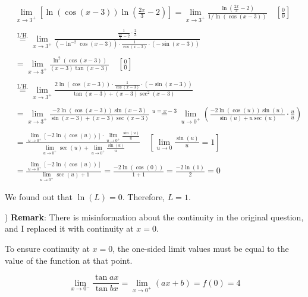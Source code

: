 \documentclass{article}
\begin{document}
\begin{align*}&\lim_{x\to3^+}\left[ \ln\left(\cos(x-3)\right)\ln\left(\frac{2x}{3}-2\right)\right] = \lim_{x\to3^+}\frac{\ln\left(\frac{2x}{3}-2\right)}{1/ \ln\left(\cos(x-3)\right)} \quad \left[\frac00\right] \\\\&\overset{\text{L'H.}}{=} \lim_{x\to3^+}\frac{\displaystyle\frac1{\frac{2x}{3} - 2}\cdot \frac{2}{3}}{\displaystyle \left(-\ln^{-2}\displaystyle \cos(x-3)\right)\cdot \frac{1}{\cos(x-3)}\cdot(-\sin(x-3))}\\\\&= \lim_{x\to3^+} \displaystyle\frac{\ln^2(\cos(x-3))}{(x-3)\tan(x-3)} \quad\left[\frac00\right]\\\\&\overset{\text{L'H.}}{=} \lim_{x\to3^+} \frac{\displaystyle2\ln(\cos(x-3))\cdot\frac{1}{\cos(x-3)}\cdot(-\sin(x-3))}{\tan(x-3) + (x-3)\sec^2(x-3)}\\\\&=\lim_{x\to3^+}\frac{\displaystyle-2\ln(\cos(x-3))\sin(x-3)}{\sin(x-3) + (x-3)\sec(x-3)} \overset{u=x-3}{=} \lim_{u\to0^+}\left(\frac{\displaystyle-2\ln(\cos(u))\sin(u)}{\sin(u) + u\sec(u)} \cdot\frac{u}{u}\right)\\\\& = \frac{\displaystyle\lim_{u\to0^+}[-2\ln(\cos(u))]\cdot \lim_{u\to0^+}\frac{\sin(u)}{u}}{\displaystyle\lim_{u\to0^+}\sec(u)+\lim_{u\to0^+}\frac{\sin(u)}{u}}\quad \left[\lim_{u\to0} \frac{\sin(u)}u=1\right]\\\\&=\frac{\displaystyle\lim_{u\to0^+}[-2\ln(\cos(u))]}{\displaystyle\lim_{u\to0^+}\sec(u)+1}  =\frac{-2\ln(\cos(0))}{1+1} =\frac{-2\ln(1)}{2} = 0\end{align*}

\hfill

\noindent We found out that $\ln(L) = 0$. Therefore, $\boxed{L = 1}$.

) \textbf{Remark}: There is misinformation about the continuity in the original question, and I replaced it with continuity at $x=0$.

\hfill

\noindent To ensure continuity at $x=0$, the one-sided limit values must be equal to the value of the function at that point.

\begin{equation*}
\lim_{x\to0^-} \frac{\tan ax}{\tan bx} = \lim_{x\to0^+} (ax+b) = f(0) = 4
\end{equation*}
\end{document}

